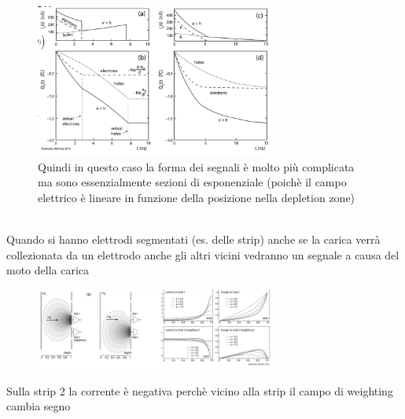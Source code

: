 \begin{figure}[H]
    \centering
    \includegraphics[width=0.7\textwidth,frame]{Chapters/images/Interazione_radiazione_materia/image-20220223213850670.png}
    \captionsetup{width=0.7\textwidth}
    \captionsetup{width=0.9\textwidth}
    \caption{Quindi in questo caso la forma dei segnali è molto più complicata ma sono essenzialmente sezioni di esponenziale (poichè il campo elettrico è lineare in funzione della posizione nella depletion zone)}
    \label{fig:}
\end{figure}

\begin{remark} \hfill \\ 
    Quando si hanno elettrodi segmentati (es. delle strip) anche se la carica verrà collezionata da un elettrodo anche gli altri vicini vedranno un segnale a causa del moto della carica
    \begin{figure}[H]
        \centering
        \includegraphics[width=0.7\textwidth,frame]{Chapters/images/Interazione_radiazione_materia/image-20220223214312686.png}
    \end{figure}
    Sulla strip 2 la corrente è negativa perchè vicino alla strip il campo di weighting cambia segno
\end{remark}

